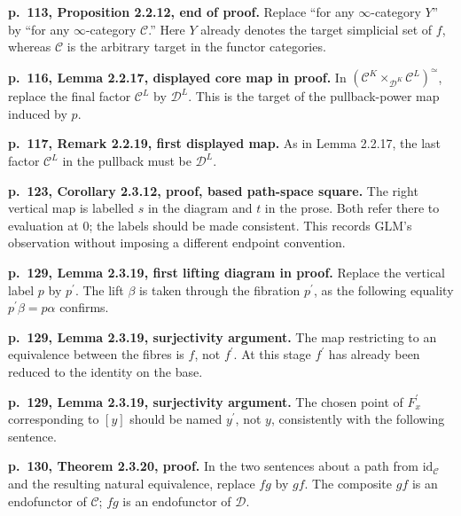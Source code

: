 \par{}
\noindent\textbf{p.~113, Proposition 2.2.12, end of proof.}\enspace
Replace ``for any $\infty$-category $Y$'' by ``for any $\infty$-category $\mathcal C$.'' Here $Y$ already denotes the target simplicial set of $f$, whereas $\mathcal C$ is the arbitrary target in the functor categories.

\par{}
\noindent\textbf{p.~116, Lemma 2.2.17, displayed core map in proof.}\enspace
In $(\mathcal C^K\times_{\mathcal D^K}\mathcal C^L)^{\simeq}$, replace the final factor $\mathcal C^L$ by $\mathcal D^L$. This is the target of the pullback-power map induced by $p$.

\par{}
\noindent\textbf{p.~117, Remark 2.2.19, first displayed map.}\enspace
As in Lemma 2.2.17, the last factor $\mathcal C^L$ in the pullback must be $\mathcal D^L$.

\par{}
\noindent\textbf{p.~123, Corollary 2.3.12, proof, based path-space square.}\enspace
The right vertical map is labelled $s$ in the diagram and $t$ in the prose. Both refer there to evaluation at $0$; the labels should be made consistent. This records GLM's observation without imposing a different endpoint convention.

\par{}
\noindent\textbf{p.~129, Lemma 2.3.19, first lifting diagram in proof.}\enspace
Replace the vertical label $p$ by $p^{\prime}$. The lift $\beta$ is taken through the fibration $p^{\prime}$, as the following equality $p^{\prime}\beta=p\alpha$ confirms.

\par{}
\noindent\textbf{p.~129, Lemma 2.3.19, surjectivity argument.}\enspace
The map restricting to an equivalence between the fibres is $f$, not $f^{\prime}$. At this stage $f^{\prime}$ has already been reduced to the identity on the base.

\par{}
\noindent\textbf{p.~129, Lemma 2.3.19, surjectivity argument.}\enspace
The chosen point of $F^{\prime}_x$ corresponding to $[y]$ should be named $y^{\prime}$, not $y$, consistently with the following sentence.

\par{}
\noindent\textbf{p.~130, Theorem 2.3.20, proof.}\enspace
In the two sentences about a path from $\mathrm{id}_{\mathcal C}$ and the resulting natural equivalence, replace $fg$ by $gf$. The composite $gf$ is an endofunctor of $\mathcal C$; $fg$ is an endofunctor of $\mathcal D$.

